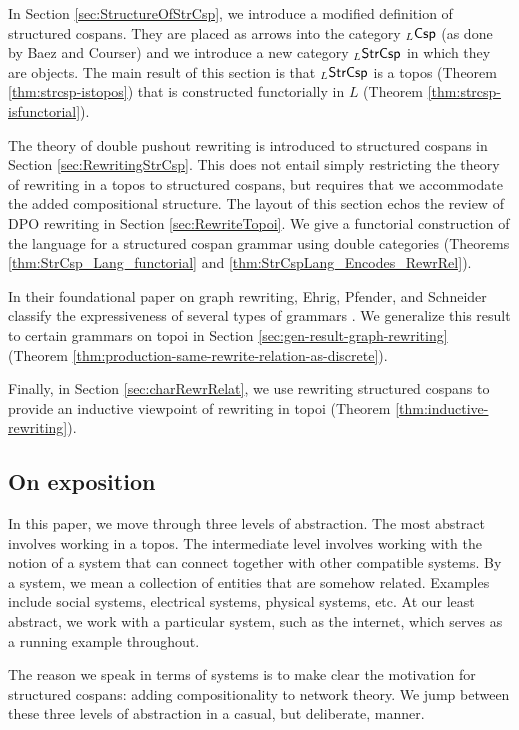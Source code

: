 \documentclass{amsart}
\begin{document}
In Section \ref{sec:StructureOfStrCsp}, we
introduce a modified definition of structured
cospans. They are placed as arrows into the
category $ _L\mathsf{Csp} $ (as done by Baez and Courser)
and we introduce a new category $ _L\mathsf{StrCsp} $ in
which they are objects. The main result of this
section is that $ _L\mathsf{StrCsp} $ is a topos (Theorem
\ref{thm:strcsp-istopos}) that is
constructed functorially in $ L $ (Theorem
\ref{thm:strcsp-isfunctorial}).

The theory of double pushout rewriting is
introduced to structured cospans in Section
\ref{sec:RewritingStrCsp}. This does not entail
simply restricting the theory of rewriting in a
topos to structured cospans, but requires that we
accommodate the added compositional
structure. The layout of this section echos the
review of DPO rewriting in Section
\ref{sec:RewriteTopoi}. We give a functorial
construction of the language for a structured
cospan grammar using double categories (Theorems
\ref{thm:StrCsp_Lang_functorial} and
\ref{thm:StrCspLang_Encodes_RewrRel}).

In their foundational paper on graph rewriting,
Ehrig, Pfender, and Schneider classify the expressiveness of
several types of grammars
\cite[Prop.~3.3]{Ehrig_GraphGram}. We generalize
this result to certain grammars on topoi in
Section \ref{sec:gen-result-graph-rewriting}
(Theorem
\ref{thm:production-same-rewrite-relation-as-discrete}).

Finally, in Section \ref{sec:charRewrRelat}, we
use rewriting structured cospans to provide an
inductive viewpoint of rewriting in topoi (Theorem
\ref{thm:inductive-rewriting}). 

\subsection{On exposition}
\label{sec:word-about-expos}

In this paper, we move through three levels of
abstraction. The most abstract involves working
in a topos.  The intermediate level
involves working with the notion of a system
that can connect together with other compatible
systems. By a system, we mean a collection of
entities that are somehow related. Examples
include social systems, electrical systems,
physical systems, etc.  At our least
abstract, we work with a particular system, such
as the internet, which serves as a running example
throughout.

The reason we speak in terms of systems is to
make clear the motivation for structured cospans:
adding compositionality to network theory.  We
jump between these three levels of abstraction in
a casual, but deliberate, manner. 
\end{document}
